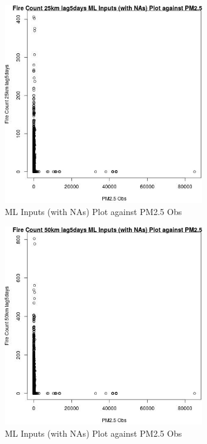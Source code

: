 \begin{figure} 
\centering  
\includegraphics[width=0.77\textwidth]{Code_Outputs/Report_ML_input_PM25_Step4_part_f_de_duplicated_aves_prioritize_24hr_obswNAs_Fire_Count_25km_lag5daysvPM25_Obs.jpg} 
\caption{\label{fig:Report_ML_input_PM25_Step4_part_f_de_duplicated_aves_prioritize_24hr_obswNAsFire_Count_25km_lag5daysvPM25_Obs}ML Inputs (with NAs) Plot against PM2.5 Obs} 
\end{figure} 
 

\begin{figure} 
\centering  
\includegraphics[width=0.77\textwidth]{Code_Outputs/Report_ML_input_PM25_Step4_part_f_de_duplicated_aves_prioritize_24hr_obswNAs_Fire_Count_50km_lag5daysvPM25_Obs.jpg} 
\caption{\label{fig:Report_ML_input_PM25_Step4_part_f_de_duplicated_aves_prioritize_24hr_obswNAsFire_Count_50km_lag5daysvPM25_Obs}ML Inputs (with NAs) Plot against PM2.5 Obs} 
\end{figure} 
 

